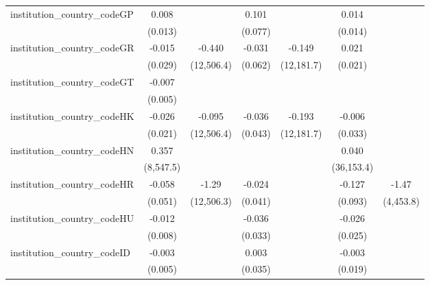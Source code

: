 \begin{tabular}{lcccccc}
   institution\_country\_codeGP          & 0.008          &               & 0.101         &               & 0.014         &   \\   
                                         & (0.013)        &               & (0.077)       &               & (0.014)       &   \\   
   institution\_country\_codeGR          & -0.015         & -0.440        & -0.031        & -0.149        & 0.021         &   \\   
                                         & (0.029)        & (12,506.4)    & (0.062)       & (12,181.7)    & (0.021)       &   \\   
   institution\_country\_codeGT          & -0.007         &               &               &               &               &   \\   
                                         & (0.005)        &               &               &               &               &   \\   
   institution\_country\_codeHK          & -0.026         & -0.095        & -0.036        & -0.193        & -0.006        &   \\   
                                         & (0.021)        & (12,506.4)    & (0.043)       & (12,181.7)    & (0.033)       &   \\   
   institution\_country\_codeHN          & 0.357          &               &               &               & 0.040         &   \\   
                                         & (8,547.5)      &               &               &               & (36,153.4)    &   \\   
   institution\_country\_codeHR          & -0.058         & -1.29         & -0.024        &               & -0.127        & -1.47\\   
                                         & (0.051)        & (12,506.3)    & (0.041)       &               & (0.093)       & (4,453.8)\\   
   institution\_country\_codeHU          & -0.012         &               & -0.036        &               & -0.026        &   \\   
                                         & (0.008)        &               & (0.033)       &               & (0.025)       &   \\   
   institution\_country\_codeID          & -0.003         &               & 0.003         &               & -0.003        &   \\   
                                         & (0.005)        &               & (0.035)       &               & (0.019)       &   \\   

\end{tabular}
